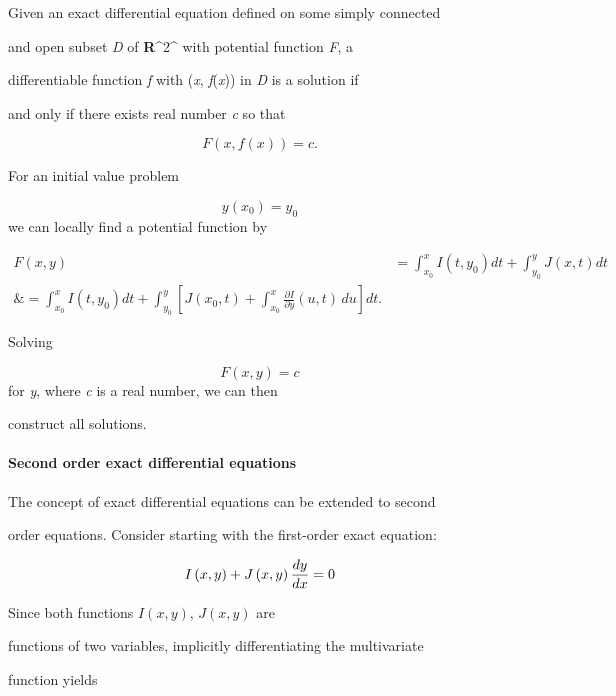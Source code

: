 Given an exact differential equation defined on some simply connected

and open subset \textit{D} of \textbf{R}^2^ with potential function \textit{F}, a

differentiable function \textit{f} with (\textit{x}, \textit{f}(\textit{x})) in \textit{D} is a solution if

and only if there exists real number \textit{c} so that



$$F(x, f(x)) = c.$$



For an initial value problem



$$y(x_0) = y_0$$ we can locally find a potential function by



\begin{align}
F(x,y) &= \int_{x_0}^x I(t,y_0) dt + \int_{y_0}^y J(x,t) dt \\\&= \int_{x_0}^x I(t,y_0) dt + \int_{y_0}^y \left[ J(x_0,t) +  \int_{x_0}^{x} \frac{\partial I}{\partial y}(u, t)\, du \right]dt.
\end{align}



Solving



$$F(x,y) = c$$ for \textit{y}, where \textit{c} is a real number, we can then

construct all solutions.



\paragraph{Second order exact differential equations}



The concept of exact differential equations can be extended to second

order equations. Consider starting with the first-order exact equation:



$$I\left(x,y\right)+J\left(x,y\right){dy \over dx}=0$$



Since both functions $I\left(x,y\right)$, $J\left(x,y\right)$ are

functions of two variables, implicitly differentiating the multivariate

function yields



